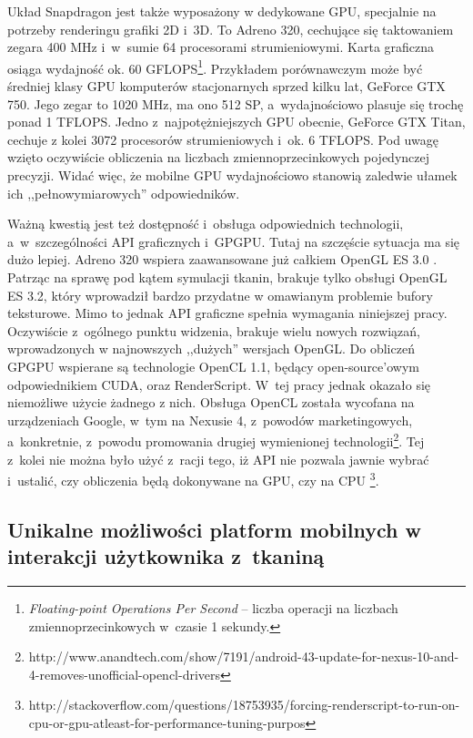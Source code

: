 		Układ Snapdragon jest także wyposażony w dedykowane GPU, specjalnie na potrzeby renderingu grafiki 2D i~3D. To Adreno 320, cechujące się taktowaniem zegara 400 MHz i~w~sumie 64 procesorami strumieniowymi. Karta graficzna osiąga wydajność ok. 60 GFLOPS\footnote{\emph{Floating-point Operations Per Second} -- liczba operacji na liczbach zmiennoprzecinkowych w~czasie 1 sekundy.}. Przykładem porównawczym może być średniej klasy GPU komputerów stacjonarnych sprzed kilku lat, GeForce GTX 750. Jego zegar to 1020 MHz, ma ono 512 SP, a~wydajnościowo plasuje się trochę ponad 1 TFLOPS. Jedno z~najpotężniejszych GPU obecnie, GeForce GTX Titan, cechuje z kolei 3072 procesorów strumieniowych i~ok. 6 TFLOPS. Pod uwagę wzięto oczywiście obliczenia na liczbach zmiennoprzecinkowych pojedynczej precyzji. Widać więc, że mobilne GPU wydajnościowo stanowią zaledwie ułamek ich ,,pełnowymiarowych'' odpowiedników.
		
		Ważną kwestią jest też dostępność i~obsługa odpowiednich technologii, a~w~szczególności API graficznych i~GPGPU. Tutaj na szczęście sytuacja ma się dużo lepiej. Adreno 320 wspiera zaawansowane już całkiem OpenGL ES 3.0 \cite{specs_adreno}. Patrząc na sprawę pod kątem symulacji tkanin, brakuje tylko obsługi OpenGL ES 3.2, który wprowadził bardzo przydatne w omawianym problemie bufory teksturowe. Mimo to jednak API graficzne spełnia wymagania niniejszej pracy. Oczywiście z~ogólnego punktu widzenia, brakuje wielu nowych rozwiązań, wprowadzonych w najnowszych ,,dużych'' wersjach OpenGL. Do obliczeń GPGPU wspierane są technologie OpenCL 1.1, będący open-source'owym odpowiednikiem CUDA, oraz RenderScript. W~tej pracy jednak okazało się niemożliwe użycie żadnego z nich. Obsługa OpenCL została wycofana na urządzeniach Google, w~tym na Nexusie 4, z~powodów marketingowych, a~konkretnie, z~powodu promowania drugiej wymienionej technologii\footnote{http://www.anandtech.com/show/7191/android-43-update-for-nexus-10-and-4-removes-unofficial\allowbreak-opencl-drivers}. Tej z~kolei nie można było użyć z~racji tego, iż API nie pozwala jawnie wybrać i~ustalić, czy obliczenia będą dokonywane na GPU, czy na CPU \footnote{http://stackoverflow.com/questions/18753935/forcing-renderscript-to-run-on-cpu-or-gpu-atleast\allowbreak-for-performance-tuning-purpos}.
		
		\subsection{Unikalne możliwości platform mobilnych w interakcji użytkownika z~tkaniną}
		\label{t:technologie:mobilne:interakcja}
		
